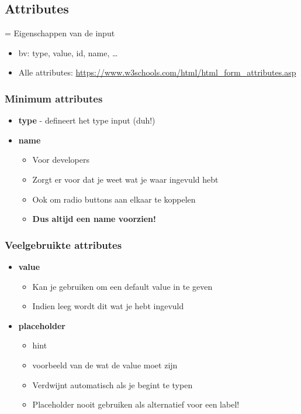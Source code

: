 \documentclass{article}
\newcommand{\bold}[1]{\textbf{#1}}
\begin{document}
\subsection{Attributes}
= Eigenschappen van de input

\begin{itemize}
    \item bv: type, value, id, name, \dots
    \item Alle attributes: \url{https://www.w3schools.com/html/html_form_attributes.asp}
\end{itemize}

\subsubsection{Minimum attributes}
\begin{itemize}
    \item \bold{type} - defineert het type input (duh!)
    \item \bold{name}
    \begin{itemize}
        \item Voor developers
        \item Zorgt er voor dat je weet wat je waar ingevuld hebt
        \item Ook om radio buttons aan elkaar te koppelen
        \item \bold{Dus altijd een name voorzien!}
    \end{itemize}
\end{itemize}

\subsubsection{Veelgebruikte attributes}

\begin{itemize}
    \item \bold{value}
    \begin{itemize}
        \item Kan je gebruiken om een default value in te geven
        \item Indien leeg wordt dit wat je hebt ingevuld
    \end{itemize}
    \item \bold{placeholder}
    \begin{itemize}
        \item hint
        \item voorbeeld van de wat de value moet zijn
        \item Verdwijnt automatisch als je begint te typen
        \item Placeholder nooit gebruiken als alternatief voor een label!
    \end{itemize}
\end{itemize}
\end{document}
